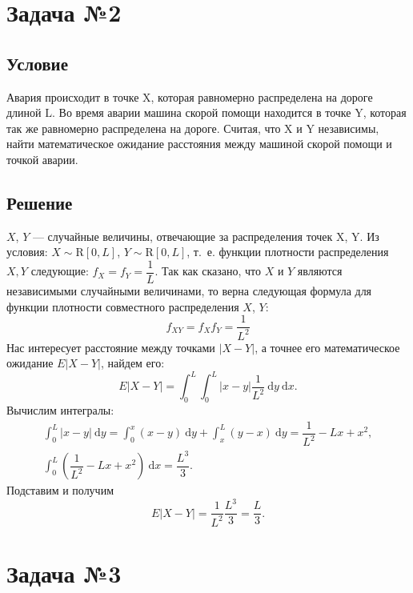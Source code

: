 \documentclass[12pt, a4paper]{article}
\begin{document}
		
	\newpage
	\section{Задача №2}
	
		\subsection*{Условие}	
			Авария происходит в точке $\mathrm{X}$, которая равномерно распределена на дороге длиной $\mathrm{L}$. Во время аварии машина скорой помощи находится в точке $\mathrm{Y}$, которая так же равномерно распределена на дороге. Считая, что $\mathrm{X}$ и $\mathrm{Y}$ независимы, найти математическое ожидание расстояния между машиной скорой помощи и точкой аварии.
		\subsection*{Решение}
			$X$, $Y$ --- случайные величины, отвечающие за распределения точек $\mathrm{X}$, $\mathrm{Y}$.
			Из условия:
			$X \sim \mathrm{R} \left[0, L\right]$, $Y  \sim \mathrm{R} \left[0, L\right]$, т.~е. функции плотности распределения $X, Y$ следующие: $f_{X} = f_{Y} = \dfrac{1}{L}$. Так как сказано, что $X$ и $Y$ являются независимыми случайными величинами, то верна следующая формула для функции плотности совместного распределения $X$, $Y$:
			$$
				f_{XY} = f_X f_Y = \dfrac{1}{L^2}
			$$
			Нас интересует расстояние между точками $|X - Y|$, а точнее его математическое ожидание $E|X - Y|$, найдем его:
			$$
				E|X - Y| = \int_{0}^{L} \int_{0}^{L} |x - y| \dfrac{1}{L^2} \ \mathrm{d} y \ \mathrm{d} x.
			$$
			Вычислим интегралы:
			\begin{gather*}
					\int_{0}^{L} |x - y| \ \mathrm{d} y = 
					\int_{0}^{x} (x - y) \ \mathrm{d} y +
					\int_{x}^{L} (y - x) \ \mathrm{d} y = 	
					\dfrac{1}{L^2} - L x + x^2, \\
					\int_{0}^{L} \left( \dfrac{1}{L^2} - L x + x^2 \right) \ \mathrm{d} x = \dfrac{L^3}{3}.
			\end{gather*}
			Подставим и получим 
			$$
				E|X - Y| = \dfrac{1}{L^2} \dfrac{L^3}{3} = \dfrac{L}{3}.
			$$
			
	\newpage
	\section{Задача №3}
	
\end{document}
